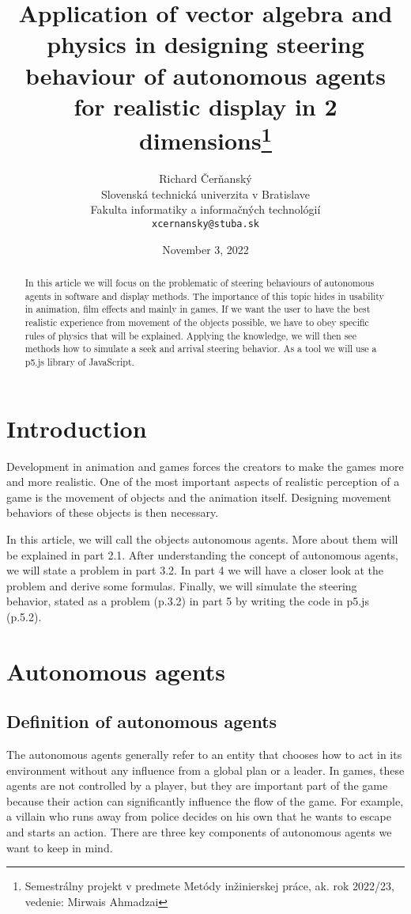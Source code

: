 \documentclass[10pt,twoside,slovak,a4paper]{article}
\title{Application of vector algebra and physics in designing steering behaviour of autonomous agents for realistic display in 2 dimensions\thanks{Semestrálny projekt v predmete Metódy inžinierskej práce, ak. rok 2022/23, vedenie: Mirwais Ahmadzai}}
\author{Richard Čerňanský\\[2pt]
	{\small Slovenská technická univerzita v Bratislave}\\
	{\small Fakulta informatiky a informačných technológií}\\
	{\small \texttt{xcernansky@stuba.sk}}
	}
\date{\small November 3, 2022 }
\begin{document}
\maketitle

\begin{abstract}

In this article we will focus on the problematic of steering behaviours of autonomous agents in software and display methods. The importance of this topic hides in usability in animation, film effects and mainly in games. If we want the user to have the best realistic experience from movement of the objects possible, we have to obey specific rules of physics that will be explained. Applying the knowledge, we will then see methods how to simulate a seek and arrival steering behavior. As a tool we will use a p5.js library of JavaScript.

\end{abstract}


\section{Introduction}

Development in animation and games forces the creators to make the games more and more realistic. One of the most important aspects of realistic perception of a game is the movement of objects and the animation itself. Designing movement behaviors of these objects is then necessary. 

In this article, we will call the objects autonomous agents. More about them will be explained in part 2.1. After understanding the concept of autonomous agents, we will state a problem in part 3.2. In part 4 we will have a closer look at the problem and derive some formulas. Finally, we will simulate the steering behavior, stated as a problem (p.3.2) in part 5 by writing the code in p5.js (p.5.2).

\section{Autonomous agents} \label{autonomous agents}

\subsection{Definition of autonomous agents} \label{definition of a.a.}

The autonomous agents generally refer to an entity that chooses how to act in its environment without any influence from a global plan or a leader. In games, these agents are not controlled by a player, but they are important part of the game because their action can significantly influence the flow of the game. For example, a villain who runs away from police decides on his own that he wants to escape and starts an action. There are three key components of autonomous agents we want to keep in mind. 
\end{document}
